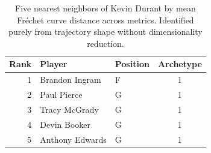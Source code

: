 \begin{table}[htbp]
  \centering\small
  \begin{tabular}{rllc}
    \toprule
    Rank & Player & Position & Archetype \\
    \midrule
    1 & Brandon Ingram & F & 1 \\
    2 & Paul Pierce & G & 1 \\
    3 & Tracy McGrady & G & 1 \\
    4 & Devin Booker & G & 1 \\
    5 & Anthony Edwards & G & 1 \\
    \bottomrule
  \end{tabular}
  \caption{Five nearest neighbors of Kevin Durant by mean Fr\'{e}chet curve distance across metrics. Identified purely from trajectory shape without dimensionality reduction.}
  \label{tab:Kevin_Durant_frechet_curve_neighbors}
\end{table}

